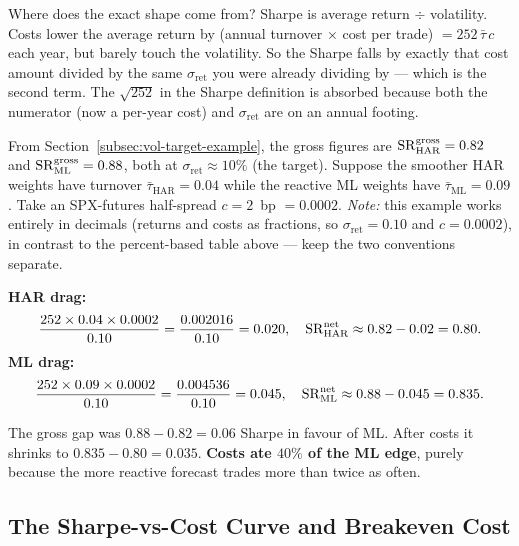 \begin{intuition}
Where does the exact shape come from? Sharpe is average return $\div$ volatility. Costs lower the average return by (annual turnover $\times$ cost per trade) $= 252\,\bar\tau\,c$ each year, but barely touch the volatility. So the Sharpe falls by exactly that cost amount divided by the same $\sigma_{\text{ret}}$ you were already dividing by --- which is the second term. The $\sqrt{252}$ in the Sharpe definition is absorbed because both the numerator (now a per-year cost) and $\sigma_{\text{ret}}$ are on an annual footing.
\end{intuition}

\begin{workedexample}
From Section~\ref{subsec:vol-target-example}, the gross figures are $\operatorname{SR}^{\text{gross}}_{\text{HAR}} = 0.82$ and $\operatorname{SR}^{\text{gross}}_{\text{ML}} = 0.88$, both at $\sigma_{\text{ret}} \approx 10\%$ (the target). Suppose the smoother HAR weights have turnover $\bar\tau_{\text{HAR}} = 0.04$ while the reactive ML weights have $\bar\tau_{\text{ML}} = 0.09$. Take an SPX-futures half-spread $c = 2$~bp $= 0.0002$. \emph{Note:} this example works entirely in decimals (returns and costs as fractions, so $\sigma_{\text{ret}} = 0.10$ and $c = 0.0002$), in contrast to the percent-based table above --- keep the two conventions separate.

\medskip
\noindent\textbf{HAR drag:}
\[
\frac{252 \times 0.04 \times 0.0002}{0.10} = \frac{0.002016}{0.10} = 0.020, \quad \operatorname{SR}^{\text{net}}_{\text{HAR}} \approx 0.82 - 0.02 = 0.80.
\]
\noindent\textbf{ML drag:}
\[
\frac{252 \times 0.09 \times 0.0002}{0.10} = \frac{0.004536}{0.10} = 0.045, \quad \operatorname{SR}^{\text{net}}_{\text{ML}} \approx 0.88 - 0.045 = 0.835.
\]

The gross gap was $0.88 - 0.82 = 0.06$ Sharpe in favour of ML. After costs it shrinks to $0.835 - 0.80 = 0.035$. \textbf{Costs ate $40\%$ of the ML edge}, purely because the more reactive forecast trades more than twice as often.
\end{workedexample}

\subsection{The Sharpe-vs-Cost Curve and Breakeven Cost}
\label{subsec:breakeven-cost}

